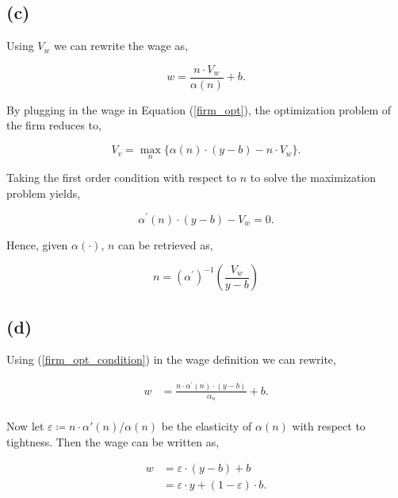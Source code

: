\documentclass[american]{scrartcl}
\begin{document}
\subsection*{(c)}

Using $V_w$ we can rewrite the wage as,

\begin{equation}
    w = \frac{n \cdot V_w}{\alpha(n)} + b.
\end{equation}

By plugging in the wage in Equation (\ref{firm_opt}), the optimization problem of the firm reduces to,

\begin{equation}
    V_v = \max_{n} \{ \alpha(n) \cdot (y - b) - n \cdot V_w \}.
\end{equation}

Taking the first order condition with respect to $n$ to solve the maximization problem yields,

\begin{equation} \label{firm_opt_condition}
    \alpha^\prime(n) \cdot(y-b) - V_w = 0.
\end{equation}

Hence, given $\alpha(\cdot)$, $n$ can be retrieved as,

\begin{equation}
    n = (\alpha^\prime)^{-1}\left( \frac{V_w}{y - b} \right)
\end{equation}


\subsection*{(d)}

Using (\ref{firm_opt_condition}) in the wage definition we can rewrite,

\begin{equation} \label{eq_wages}
    \begin{split}
        w &= \frac{n \cdot \alpha^\prime(n) \cdot(y-b)}{\alpha_n} + b. \\
    \end{split}
\end{equation}

Now let $\varepsilon \coloneqq n \cdot \alpha\prime(n) / \alpha(n)$ be the elasticity of $\alpha(n)$ with respect to tightness. Then the wage can be written as,

\begin{equation} \label{eq_wages_el}
    \begin{split}
        w &= \varepsilon \cdot (y - b) + b \\
        &= \varepsilon \cdot y + (1 - \varepsilon) \cdot b.
    \end{split}
\end{equation}
\end{document}
